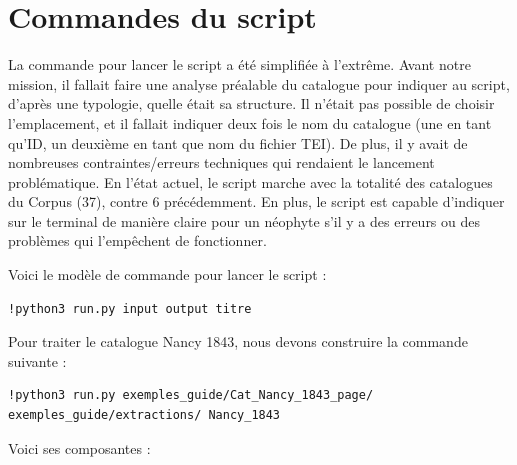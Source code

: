 \documentclass[a4paper,12pt,twoside]{book}
\begin{document}
\section{Commandes du script}
La commande pour lancer le script a été simplifiée à l'extrême. Avant notre mission, il fallait faire une analyse préalable du catalogue pour indiquer au script, d'après une typologie, quelle était sa structure. Il n'était pas possible de choisir l'emplacement, et il fallait indiquer deux fois le nom du catalogue (une en tant qu'ID, un deuxième en tant que nom du fichier TEI). De plus, il y avait de nombreuses contraintes/erreurs techniques qui rendaient le lancement problématique. En l'état actuel, le script marche avec la totalité des catalogues du Corpus (37), contre 6 précédemment. En plus, le script est capable d'indiquer sur le terminal de manière claire pour un néophyte s'il y a des erreurs ou des problèmes qui l'empêchent de fonctionner.  

Voici le modèle de commande pour lancer le script : 

\begin{normalsize}
	\begin{verbatim}
!python3 run.py input output titre
	\end{verbatim}
\end{normalsize}

Pour traiter le catalogue Nancy 1843, nous devons construire la commande suivante :

\begin{scriptsize}
	\begin{verbatim}
!python3 run.py exemples_guide/Cat_Nancy_1843_page/ exemples_guide/extractions/ Nancy_1843
	\end{verbatim}
\end{scriptsize}

Voici ses composantes :
\end{document}
